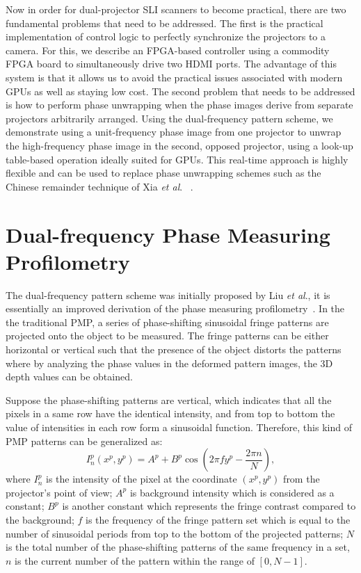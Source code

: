 \documentclass[]{spie}  %
\begin{document}
Now in order for dual-projector SLI scanners to become practical, there are two fundamental problems that need to be addressed.  The first is the practical implementation of control logic to perfectly synchronize the projectors to a camera.  For this, we describe an FPGA-based controller using a commodity FPGA board to simultaneously drive two HDMI ports.  The advantage of this system is that it allows us to avoid the practical issues associated with modern GPUs as well as staying low cost.  The second problem that needs to be addressed is how to perform phase unwrapping when the phase images derive from separate projectors arbitrarily arranged.  Using the dual-frequency pattern scheme, we demonstrate using a unit-frequency phase image from one projector to unwrap the high-frequency phase image in the second, opposed projector, using a look-up table-based operation ideally suited for GPUs. This real-time approach is highly flexible and can be used to replace phase unwrapping schemes such as the Chinese remainder technique of Xia \textit{et al}. ~\cite{xiax07}.

\section{Dual-frequency Phase Measuring Profilometry}
The dual-frequency pattern scheme was initially proposed by Liu \textit{et al}.\cite{liuk10}, it is essentially  an improved derivation of the phase measuring profilometry~\cite{hali89}. In the the traditional PMP, a series of phase-shifting sinusoidal fringe patterns are projected onto the object to be measured.  The fringe patterns can be either horizontal or vertical such that the presence of the object distorts the patterns where by analyzing the phase values in the deformed pattern images, the 3D depth values can be obtained.

Suppose the phase-shifting patterns are vertical, which indicates that all the pixels in a same row have the identical intensity, and from top to bottom the value of intensities in each row form a sinusoidal function. Therefore, this kind of PMP patterns can be generalized as:
\begin{equation} \label{eq:1.1}
I^p_n(x^p, y^p) = A^p + B^p\cos\left(2\pi f y^p - \frac{2\pi n}{N}\right),
\end{equation}
where $I^p_n$ is the intensity of the pixel at the coordinate $(x^p, y^p)$ from the projector's point of view; $A^p$ is background intensity which is considered as a constant; $B^p$ is another constant which represents the fringe contrast compared to the background; $f$ is the frequency of the fringe pattern set which is equal to the number of sinusoidal periods from top to the bottom of the projected patterns; $N$ is the total number of the phase-shifting patterns of the same frequency in a set, $n$ is the current number of the pattern within the range of $[0, N-1]$.
\end{document}
